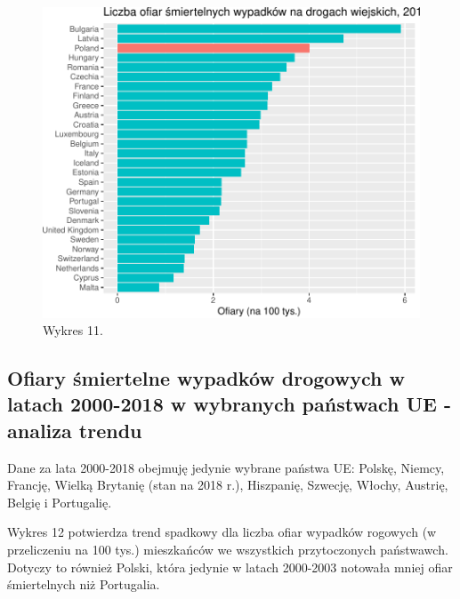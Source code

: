\documentclass[
]{article}
\begin{document}
\begin{figure}

\includegraphics{raport_wypadki_files/figure-latex/unnamed-chunk-19-1} \hfill{}

\caption{Wykres 11.}\label{fig:unnamed-chunk-19}
\end{figure}

\hypertarget{ofiary-ux15bmiertelne-wypadkuxf3w-drogowych-w-latach-2000-2018-w-wybranych-paux144stwach-ue---analiza-trendu}{%
\subsection{Ofiary śmiertelne wypadków drogowych w latach 2000-2018 w
wybranych państwach UE - analiza
trendu}\label{ofiary-ux15bmiertelne-wypadkuxf3w-drogowych-w-latach-2000-2018-w-wybranych-paux144stwach-ue---analiza-trendu}}

Dane za lata 2000-2018 obejmuję jedynie wybrane państwa UE: Polskę,
Niemcy, Francję, Wielką Brytanię (stan na 2018 r.), Hiszpanię, Szwecję,
Włochy, Austrię, Belgię i Portugalię.

Wykres 12 potwierdza trend spadkowy dla liczba ofiar wypadków rogowych
(w przeliczeniu na 100 tys.) mieszkańców we wszystkich przytoczonych
państwawch. Dotyczy to również Polski, która jedynie w latach 2000-2003
notowała mniej ofiar śmiertelnych niż Portugalia.
\end{document}
